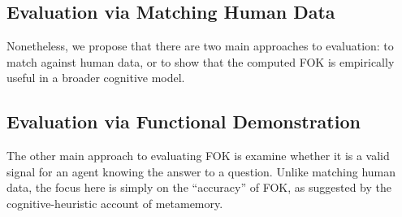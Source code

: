 \documentclass[10pt,letterpaper]{article}
\begin{document}
\subsection{Evaluation via Matching Human Data}

Nonetheless, we propose that there are two main approaches to evaluation: to match against human data, or to show that the computed FOK is empirically useful in a broader cognitive model.





\subsection{Evaluation via Functional Demonstration}

The other main approach to evaluating FOK is examine whether it is a valid signal for an agent knowing the answer to a question.
Unlike matching human data, the focus here is simply on the ``accuracy'' of FOK, as suggested by the cognitive-heuristic account of metamemory.

\end{document}

